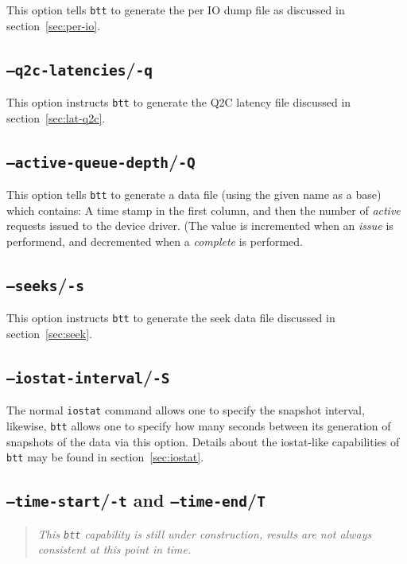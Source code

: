 \documentclass{article}
\begin{document}
  This option tells \texttt{btt} to generate the per IO dump file as
  discussed in section~\ref{sec:per-io}.

\subsection{\label{sec:o-q}\texttt{--q2c-latencies}/\texttt{-q}}

  This option instructs \texttt{btt} to generate the Q2C latency file
  discussed in section~\ref{sec:lat-q2c}.

\subsection{\label{sec:o-Q}\texttt{--active-queue-depth}/\texttt{-Q}}

  This option tells \texttt{btt} to generate a data file (using the given
  name as a base) which contains: A time stamp in the first column,
  and then the number of \emph{active} requests issued to the device
  driver. (The value is incremented when an \emph{issue} is performend,
  and decremented when a \emph{complete} is performed.

\subsection{\label{sec:o-s}\texttt{--seeks}/\texttt{-s}}

  This option instructs \texttt{btt} to generate the seek data file
  discussed in section~\ref{sec:seek}.

\subsection{\label{sec:o-S}\texttt{--iostat-interval}/\texttt{-S}}

  The normal \texttt{iostat} command allows one to specify the snapshot
  interval, likewise, \texttt{btt} allows one to specify how many seconds
  between its generation of snapshots of the data via this option. Details
  about the iostat-like capabilities of \texttt{btt} may be found in
  section~\ref{sec:iostat}.

\subsection{\label{sec:o-tT}\texttt{--time-start}/\texttt{-t} and
\texttt{--time-end}/\texttt{T}}

  \begin{quote}
    \emph{This \texttt{btt} capability is still under construction, results are
    not always consistent at this point in time.}
  \end{quote}
\end{document}
